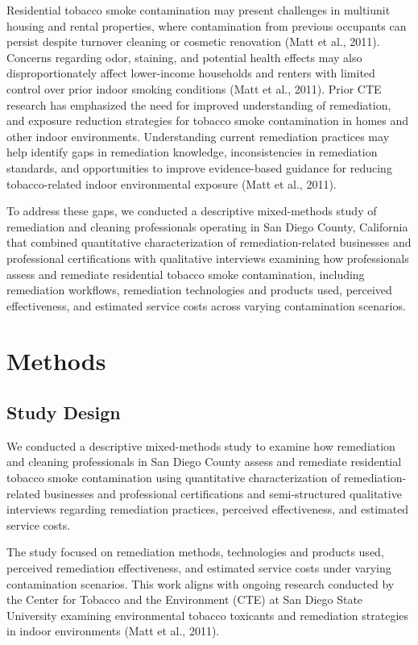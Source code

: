 \documentclass[stu]{apa7}
\begin{document}
Residential tobacco smoke contamination may present challenges in multiunit housing and rental properties, where contamination from previous occupants can persist despite turnover cleaning or cosmetic renovation (Matt et al., 2011). Concerns regarding odor, staining, and potential health effects may also disproportionately affect lower-income households and renters with limited control over prior indoor smoking conditions (Matt et al., 2011). Prior CTE research has emphasized the need for improved understanding of remediation, and exposure reduction strategies for tobacco smoke contamination in homes and other indoor environments. Understanding current remediation practices may help identify gaps in remediation knowledge, inconsistencies in remediation standards, and opportunities to improve evidence-based guidance for reducing tobacco-related indoor environmental exposure (Matt et al., 2011).

To address these gaps, we conducted a descriptive mixed-methods study of remediation and cleaning professionals operating in San Diego County, California that combined quantitative characterization of remediation-related businesses and professional certifications with qualitative interviews examining how professionals assess and remediate residential tobacco smoke contamination, including remediation workflows, remediation technologies and products used, perceived effectiveness, and estimated service costs across varying contamination scenarios.

\section{Methods}

\subsection{Study Design}

We conducted a descriptive mixed-methods study to examine how remediation and cleaning professionals in San Diego County assess and remediate residential tobacco smoke contamination using quantitative characterization of remediation-related businesses and professional certifications and semi-structured qualitative interviews regarding remediation practices, perceived effectiveness, and estimated service costs.

The study focused on remediation methods, technologies and products used, perceived remediation effectiveness, and estimated service costs under varying contamination scenarios. This work aligns with ongoing research conducted by the Center for Tobacco and the Environment (CTE) at San Diego State University examining environmental tobacco toxicants and remediation strategies in indoor environments (Matt et al., 2011).
\end{document}
